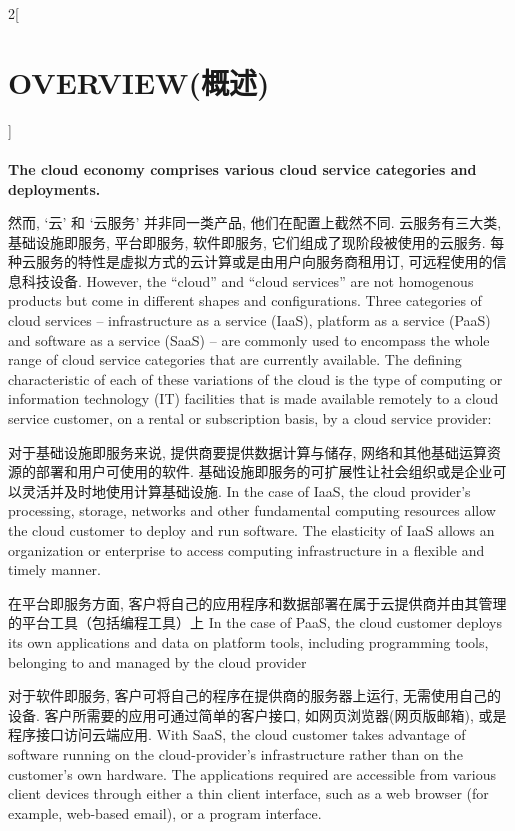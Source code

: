 \documentclass[a4paper, UTF8, 12pt]{article}
\begin{document}
\begin{paracol}{2}[\section{OVERVIEW(概述)}]
    \paragraph{}
    {\bfseries The cloud economy comprises various cloud service categories and deployments.}

    \switchcolumn*
    然而, `云' 和 `云服务' 并非同一类产品, 他们在配置上截然不同. 云服务有三大类, 基础设施即服务, 平台即服务, 软件即服务, 它们组成了现阶段被使用的云服务. 每种云服务的特性是虚拟方式的云计算或是由用户向服务商租用订, 可远程使用的信息科技设备.
    \switchcolumn
    However, the “cloud” and “cloud services” are not homogenous products but come in different shapes and configurations. Three categories of cloud services – infrastructure as a service (IaaS), platform as a service (PaaS) and software as a service (SaaS) – are commonly used to encompass the whole range of cloud service categories that are currently available. The defining characteristic of each of these variations of the cloud is the type of computing or information technology (IT) facilities that is made available remotely to a cloud service customer, on a rental or subscription basis, by a cloud service provider: 

    \switchcolumn*
    对于基础设施即服务来说, 提供商要提供数据计算与储存, 网络和其他基础运算资源的部署和用户可使用的软件. 基础设施即服务的可扩展性让社会组织或是企业可以灵活并及时地使用计算基础设施.
    \switchcolumn
    In the case of IaaS, the cloud provider’s processing, storage, networks and other fundamental computing resources allow the cloud customer to deploy and run software. The elasticity of IaaS allows an organization or enterprise to access computing infrastructure in a flexible and timely manner.  

    \switchcolumn*
    在平台即服务方面, 客户将自己的应用程序和数据部署在属于云提供商并由其管理的平台工具（包括编程工具）上
    \switchcolumn
    In the case of PaaS, the cloud customer deploys its own applications and data on platform tools, including programming tools, belonging to and managed by the cloud provider

    \switchcolumn*
    对于软件即服务, 客户可将自己的程序在提供商的服务器上运行, 无需使用自己的设备. 客户所需要的应用可通过简单的客户接口, 如网页浏览器(网页版邮箱), 或是程序接口访问云端应用.
    \switchcolumn
    With SaaS, the cloud customer takes advantage of software running on the cloud-provider’s infrastructure rather than on the customer’s own hardware. The applications required are accessible from various client devices through either a thin client interface, such as a web browser (for example, web-based email), or a program interface. 


\end{paracol}
\end{document}

